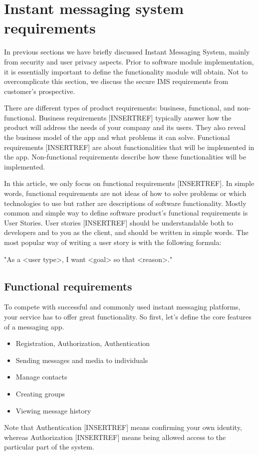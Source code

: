 \chapter{Instant messaging system requirements}\label{ch:instant-messaging-system-requirements}

In previous sections we have briefly discussed Instant Messaging System, mainly from security and user privacy aspects.
Prior to software module implementation, it is essentially important to define the functionality module will obtain.
Not to overcomplicate this section, we discuss the secure IMS requirements from customer's prospective.

There are different types of product requirements: business, functional, and non-functional.
Business requirements [INSERTREF] typically answer how the product will address the needs of your company and its users.
They also reveal the business model of the app and what problems it can solve.
Functional requirements [INSERTREF] are about functionalities that will be implemented in the app.
Non-functional requirements describe how these functionalities will be implemented.

In this article, we only focus on functional requirements [INSERTREF].
In simple words, functional requirements are not ideas of how to solve problems or which technologies to use but rather
are descriptions of software functionality.
Mostly common and simple way to define software product's functional requirements is User Stories.
User stories [INSERTREF] should be understandable both to developers and to you as the client, and should be written in simple words.
The most popular way of writing a user story is with the following formula:

\begin{center}
    "As a <user type>, I want <goal> so that <reason>."
\end{center}


\section{Functional requirements}\label{sec:functional-requirements}
To compete with successful and commonly used instant messaging platforms, your service has to offer great functionality.
So first, let’s define the core features of a messaging app.

\begin{itemize}
    \item Registration, Authorization, Authentication
    \item Sending messages and media to individuals
    \item Manage contacts
    \item Creating groups
    \item Viewing message history
\end{itemize}
Note that Authentication [INSERTREF] means confirming your own identity, whereas Authorization [INSERTREF] means being allowed access to the
particular part of the system.

